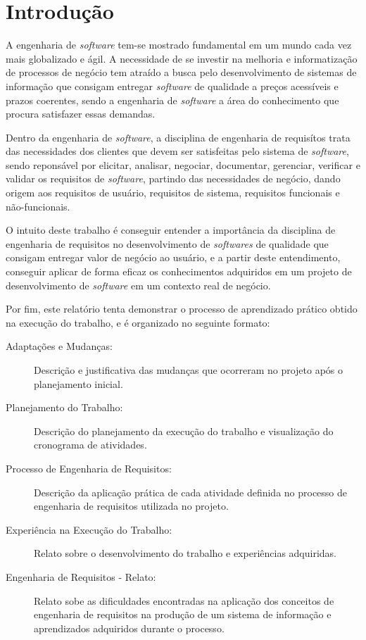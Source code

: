 \chapter{Introdução}

A engenharia de \emph{software} tem-se mostrado fundamental em um mundo cada vez mais globalizado e ágil. A necessidade de se investir na melhoria e informatização de processos de negócio tem atraído a busca pelo desenvolvimento de sistemas de informação que consigam entregar \emph{software} de qualidade a preços acessíveis e prazos coerentes, sendo a engenharia de \emph{software} a área do conhecimento que procura satisfazer essas demandas.

Dentro da engenharia de \emph{software}, a disciplina de engenharia de requisítos trata das necessidades dos clientes que devem ser satisfeitas pelo sistema de \emph{software}, sendo reponsável por elicitar, analisar, negociar, documentar, gerenciar, verificar e validar os requisitos de \emph{software}, partindo das necessidades de negócio, dando origem aos requisitos  de usuário, requisitos de sistema, requisitos funcionais e não-funcionais.

O intuito deste trabalho é conseguir entender a importância da disciplina de engenharia de requisitos no desenvolvimento de \emph{softwares} de qualidade que consigam entregar valor de negócio ao usuário, e a partir deste entendimento, conseguir aplicar de forma eficaz os conhecimentos adquiridos em um projeto de desenvolvimento de \emph{software} em um contexto real de negócio.

Por fim, este relatório tenta demonstrar o processo de aprendizado prático obtido na execução do trabalho, e é  organizado no seguinte formato:

\begin{description}
  \item [Adaptações e Mudanças:] Descrição e justificativa das mudanças que ocorreram no projeto após o planejamento inicial.
  \item [Planejamento do Trabalho:] Descrição do planejamento da execução do trabalho e visualização do cronograma de atividades.
  \item [Processo de Engenharia de Requisitos:] Descrição da aplicação prática de cada atividade definida no processo de engenharia de requisitos utilizada no projeto.
  \item [Experiência na Execução do Trabalho:] Relato sobre o desenvolvimento do trabalho e experiências adquiridas.
  \item [Engenharia de Requisitos - Relato:] Relato sobe as dificuldades encontradas na aplicação dos conceitos de engenharia de requisitos na produção de um sistema de informação e aprendizados adquiridos durante o processo.
\end{description}
